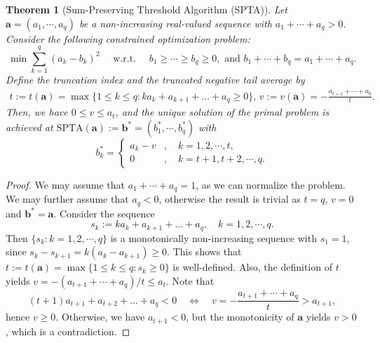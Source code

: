 \documentclass[noinfoline]{imsart}\setcounter{tocdepth}{2}
\newcommand{\m}[1]{\mathbf{#1}} %
\theoremstyle{plain}
\newtheorem{theorem}{Theorem}[section]
\begin{document}
\begin{appendix}
\begin{theorem}[Sum-Preserving Threshold Algorithm (SPTA)]\label{thm:SPTA}
Let $\m{a} = (a_{1}, \cdots, a_{q})$ be a non-increasing real-valued sequence with $a_{1} +  \cdots + a_{q} > 0$. Consider the following constrained optimization problem:
\begin{equation*}
    \min \sum_{k=1}^{q} (a_{k} - b_{k})^{2} \quad \text{ w.r.t. } \quad b_{1} \ge  \cdots \ge b_{q} \ge 0, \text{ and } b_{1} +  \cdots + b_{q} = a_{1} +  \cdots + a_{q}.
\end{equation*}
Define the truncation index and the truncated negative tail average by
\begin{align*}
    t := t(\m{a}) = \max \{ 1 \le k \le q : k a_{k} + a_{k+1} + \dots + a_{q} \ge 0 \}, \,
    v := v(\m{a}) = - \frac{a_{t+1} + \cdots + a_{q}}{t}.
\end{align*}
Then, we have $0 \le v \le a_{t}$, and the unique solution of the primal problem is achieved at $\mathrm{SPTA}(\m{a}):= \m{b}^{*} = (b^{*}_{1}, \cdots, b^{*}_{q})$ with
\begin{equation*}
    b^{*}_{k} = \begin{cases}
        a_{k} - v &, \quad k = 1, 2, \cdots, t, \\
        0 &, \quad k = t+1, t+2, \cdots, q.
    \end{cases}
\end{equation*}
\end{theorem}
\begin{proof}
We may assume that $a_{1} +  \cdots + a_{q} = 1$, as we can normalize the problem. We may further assume that $a_{q} < 0$, otherwise the result is trivial as $t = q$, $v = 0$ and $\m{b}^* = \m{a}$. Consider the sequence
\begin{equation*}
    s_{k} := k a_{k} + a_{k+1} + \dots + a_{q}, \quad k = 1, 2, \cdots, q.
\end{equation*}
Then $\{s_{k} : k = 1, 2, \cdots, q \}$ is a monotonically non-increasing sequence with $s_{1} = 1$, since $s_{k} - s_{k+1} = k (a_{k} - a_{k+1}) \ge 0$. This shows that $t := t(\m{a}) = \max \{ 1 \le k \le q : s_{k} \ge 0 \}$ is well-defined. Also, the definition of $t$ yields $v = - (a_{t+1} + \cdots + a_{q})/t \le a_{t}$. Note that 
\begin{equation*}
    (t+1) a_{t+1} + a_{t+2} + \dots + a_{q} < 0 \quad \iff \quad v = - \frac{a_{t+1} + \cdots + a_{q}}{t} > a_{t+1},
\end{equation*}
hence $v \ge 0$. Otherwise, we have $a_{t+1} < 0$, but the monotonicity of $\m{a}$ yields $v > 0$, which is a contradiction.


\end{proof}
\end{appendix}
\end{document}
